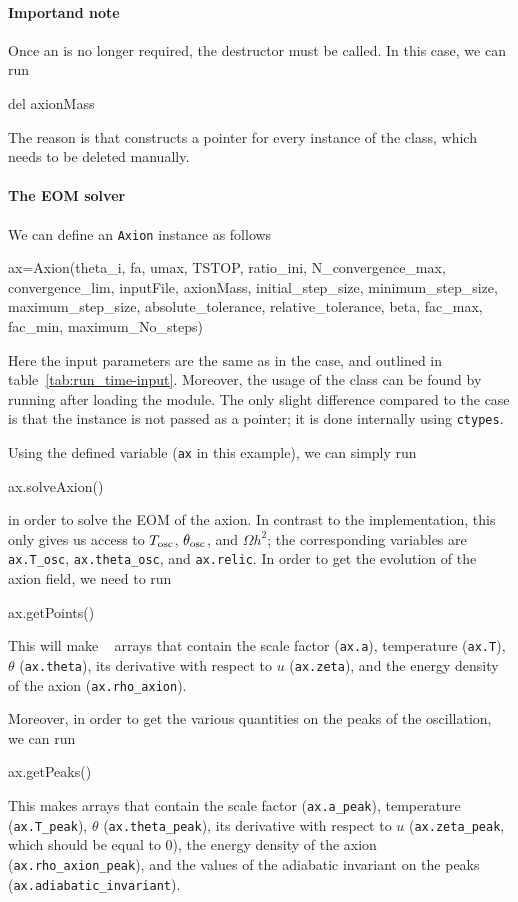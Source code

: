 \documentclass[11pt,a4paper]{article}
\begin{document}
\paragraph{Importand note} Once an  is no longer required, the destructor must be called. In this case, we can run
%
\begin{py}
	del axionMass
\end{py}
%
The reason is that \mimes constructs a pointer for every instance of the class, which needs to be deleted manually.  

\paragraph{The EOM solver}
%
We can define an {\tt Axion} instance as follows 
%
\begin{py}
	ax=Axion(theta_i, fa, umax, TSTOP, ratio_ini, N_convergence_max, convergence_lim, 
		inputFile, axionMass, initial_step_size, minimum_step_size, maximum_step_size, 
		absolute_tolerance, relative_tolerance, beta, fac_max, fac_min, maximum_No_steps)
\end{py}
%
Here the input parameters are the same as in the \CPP case, and outlined in table~\ref{tab:run_time-input}. Moreover, the usage of the class can be found by running  after loading the module. The only slight difference compared to the \CPP case is that the  instance is not passed as a pointer; it is done internally using {\tt ctypes}. 


Using the defined variable ({\tt ax} in this example), we can simply run  
%
\begin{py}
	ax.solveAxion()
\end{py}
%
in order to solve the EOM of the axion. In contrast to the \CPP implementation, this only gives us access to $T_{\rm osc}{}$, $\theta_{\rm osc}{}$, and $\Omega h^2$; the corresponding variables are {\tt ax.T\_osc}, {\tt ax.theta\_osc}, and {\tt ax.relic}. In order to get the evolution of the axion field, we need to run 
%
\begin{py}
	ax.getPoints()
\end{py}
%
This will make ~\cite{harris2020array} arrays that contain the scale factor ({\tt ax.a}), temperature ({\tt ax.T}), $\theta$ ({\tt ax.theta}), its derivative with respect to $u$ ({\tt ax.zeta}), and the energy density of the axion ({\tt ax.rho\_axion}).

Moreover, in order to get the various quantities on the peaks of the oscillation, we can run
%
\begin{py}
	ax.getPeaks()
\end{py}
%
This makes  arrays that contain the scale factor ({\tt ax.a\_peak}), temperature ({\tt ax.T\_peak}), $\theta$ ({\tt ax.theta\_peak}), its derivative with respect to $u$ ({\tt ax.zeta\_peak}, which should be equal to $0$), the energy density of the axion ({\tt ax.rho\_axion\_peak}), and the values of the adiabatic invariant on the peaks ({\tt ax.adiabatic\_invariant}).
\end{document}
